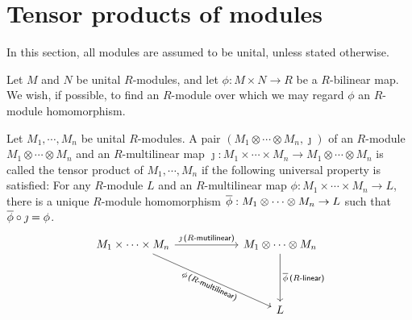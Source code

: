\section{Tensor products of modules}

In this section, all modules are assumed to be unital, unless stated otherwise.

\begin{sketch}
    Let $M$ and $N$ be unital $R$-modules, and let $\phi: M\times N\rightarrow R$ be a $R$-bilinear map.
    We wish, if possible, to find an $R$-module over which we may regard $\phi$ an $R$-module homomorphism.
\end{sketch}
\begin{defi}
    Let $M_1, \cdots, M_n$ be unital $R$-modules.
    A pair $(M_1\otimes\cdots\otimes M_n, \jmath)$ of an $R$-module $M_1\otimes\cdots\otimes M_n$ and an $R$-multilinear map $\jmath: M_1\times\cdots\times M_n\rightarrow M_1\otimes\cdots\otimes M_n$ is called the tensor product of $M_1, \cdots, M_n$ if the following universal property is satisfied:
    For any $R$-module $L$ and an $R$-multilinear map $\phi: M_1\times\cdots\times M_n\rightarrow L$, there is a unique $R$-module homomorphism $\overline{\phi}: M_1\otimes\cdots\otimes M_n\rightarrow L$ such that $\overline{\phi}\circ\jmath=\phi$.
    \begin{equation*}
    \begin{tikzcd}[row sep=1.5cm, column sep=2.0cm]
        M_1 \times\cdots\times M_n
        \arrow[r, "\jmath\,\textsf{($R$-mutilinear)}"]
        \arrow[dr, "\phi\,\textsf{($R$-multilinear)}"'{sloped}]
        &
        M_1 \otimes\cdots\otimes M_n
        \arrow[d, "\ol\phi\,\textsf{($R$-linear)}"]
        \\
        &
        L
    \end{tikzcd}
    \end{equation*}
\end{defi}